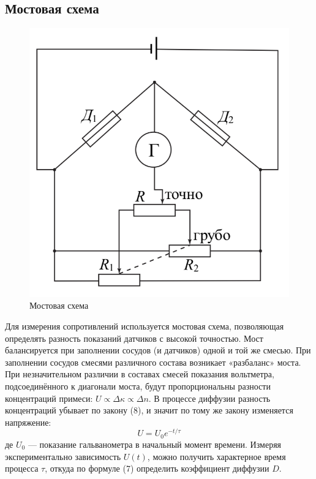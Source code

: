 \documentclass[a4paper,12pt]{article}
\theoremstyle{plain} %
\theoremstyle{definition} %
\theoremstyle{remark} %
\begin{document}
\subsection{Мостовая схема}
\begin{figure}
	\includegraphics[width=\linewidth]{5}
	\caption{Мостовая схема}
\end{figure}
Для измерения сопротивлений используется мостовая схема, позволяющая определять разность показаний датчиков с высокой точностью. Мост балансируется при заполнении сосудов (и датчиков) одной и той же смесью. При заполнении сосудов смесями различного состава возникает «разбаланс» моста. При незначительном различии в составах смесей показания вольтметра, подсоединённого к диагонали моста, будут пропорциональны разности концентраций примеси: $U \propto \Delta\kappa \propto\Delta n$. В процессе диффузии разность концентраций убывает по закону (8), и значит по тому же закону изменяется напряжение:
\begin{equation}
U = U_0 e^{-t/\tau}
\end{equation}
де $U_0$ — показание гальванометра в начальный момент времени. Измеряя экспериментально зависимость $U(t)$, можно получить характерное время процесса $\tau$, откуда по формуле (7) определить коэффициент диффузии $D$.
\end{document}

